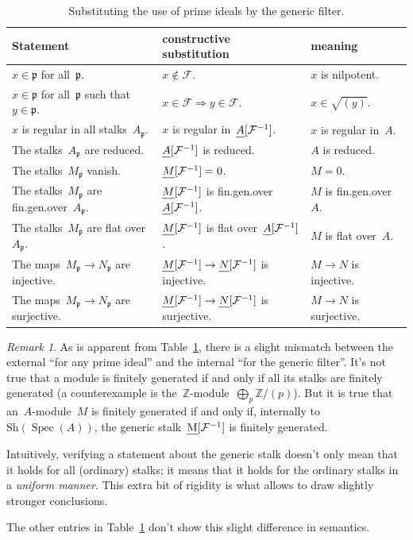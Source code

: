 \documentclass[10pt,reqno,a4paper]{amsbook}
\theoremstyle{definition}
\theoremstyle{plain}
\theoremstyle{remark}
\newtheorem{rem}[defn]{Remark}
\newcommand{\ZZ}{\mathbb{Z}}
\newcommand{\F}{\mathcal{F}}
\newcommand{\ppp}{\mathfrak{p}}
\let\oldul\ul
\renewcommand{\ul}[1]{\text{\oldul{$#1$}}}
\newcommand{\Sh}{\mathrm{Sh}}
\DeclareMathOperator{\Spec}{Spec}
\newcommand{\?}{\,{:}\,}
\renewcommand{\_}{\mathpunct{.}\,}
\begin{document}
\begin{table}
  \centering
  \renewcommand{\arraystretch}{1.3}
  \small
  \begin{tabular}{lll}
    \toprule
    Statement & constructive substitution & meaning \\\midrule
    $x \in \ppp$ for all~$\ppp$. &
    $x \not\in \F$. &
    $x$ is nilpotent. \\
    $x \in \ppp$ for all~$\ppp$ such that~$y \in \ppp$. &
    $x \in \F \Rightarrow y \in \F$. &
    $x \in \sqrt{(y)}$. \\
    $x$ is regular in all stalks~$A_\ppp$. &
    $x$ is regular in~$\ul{A}[\F^{-1}]$. &
    $x$ is regular in~$A$. \\
    The stalks~$A_\ppp$ are reduced. &
    $\ul{A}[\F^{-1}]$ is reduced. &
    $A$ is reduced. \\
    The stalks~$M_\ppp$ vanish. &
    $\ul{M}[\F^{-1}] = 0$. &
    $M = 0$. \\
    The stalks~$M_\ppp$ are fin.\@ gen.\@ over~$A_\ppp$. &
    $\ul{M}[\F^{-1}]$ is fin.\@ gen.\@ over
    $\ul{A}[\F^{-1}]$. &
    $M$ is fin.\@ gen.\@ over~$A$. \\
    The stalks~$M_\ppp$ are flat over~$A_\ppp$. &
    $\ul{M}[\F^{-1}]$ is flat over~$\ul{A}[\F^{-1}]$. &
    $M$ is flat over~$A$. \\
    The maps~$M_\ppp \to N_\ppp$ are injective. &
    $\ul{M}[\F^{-1}] \to \ul{N}[\F^{-1}]$ is injective. &
    $M \to N$ is injective. \\
    The maps~$M_\ppp \to N_\ppp$ are surjective. &
    $\ul{M}[\F^{-1}] \to \ul{N}[\F^{-1}]$ is surjective. &
    $M \to N$ is surjective. \\
    \bottomrule
  \end{tabular}
  \vspace{0.5em}

  \caption{\label{table:generic-filter-statements}Substituting the use of prime
  ideals by the generic filter.}
\end{table}

\begin{rem}As is apparent from Table~\ref{table:generic-filter-statements},
there is a slight mismatch between the external ``for any prime ideal'' and
the internal ``for the generic filter''. It's not true that a module is
finitely generated if and only if all its stalks are finitely generated (a
counterexample is the~$\ZZ$-module~$\bigoplus_p \ZZ/(p)$). But it is true that
an~$A$-module~$M$ is finitely generated if and only if, internally
to~$\Sh(\Spec(A))$, the generic stalk~$\ul{M}[\F^{-1}]$ is finitely generated.

Intuitively, verifying a statement about the generic stalk doesn't only mean
that it holds for all (ordinary) stalks; it means that it holds for the
ordinary stalks in a \emph{uniform manner}. This extra bit of rigidity is what
allows to draw slightly stronger conclusions.

The other entries in Table~\ref{table:generic-filter-statements} don't show
this slight difference in semantics.
\end{rem}
\end{document}
